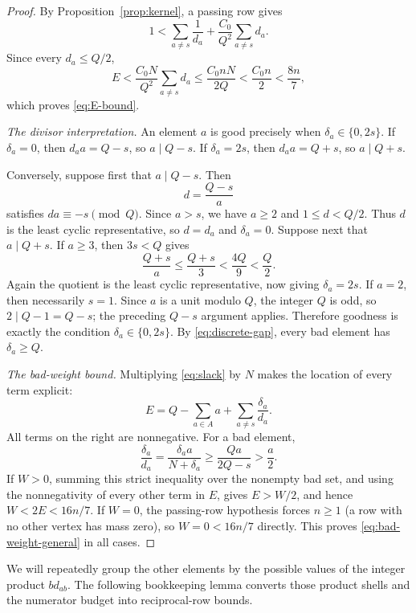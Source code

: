 \documentclass[11pt]{article}
\theoremstyle{definition}
\theoremstyle{remark}
\begin{document}
\begin{proof}
By Proposition~\ref{prop:kernel}, a passing row gives
\[
 1<\sum_{a\ne s}\frac1{d_a}
 +\frac{C_0}{Q^2}\sum_{a\ne s}d_a.
\]
Since every \(d_a\le Q/2\),
\[
 E<\frac{C_0N}{Q^2}\sum_{a\ne s}d_a
 \le\frac{C_0nN}{2Q}<\frac{C_0n}{2}<\frac{8n}{7},
\]
which proves \eqref{eq:E-bound}.

\smallskip
\noindent\emph{The divisor interpretation.}
An element \(a\) is good precisely when
\(\delta_a\in\{0,2s\}\).  If \(\delta_a=0\), then \(d_aa=Q-s\), so
\(a\mid Q-s\).  If
\(\delta_a=2s\), then \(d_aa=Q+s\), so \(a\mid Q+s\).

Conversely, suppose first that \(a\mid Q-s\).  Then
\[
 d=\frac{Q-s}{a}
\]
satisfies \(da\equiv-s\pmod Q\).  Since \(a>s\), we have \(a\ge2\)
and \(1\le d<Q/2\).  Thus \(d\) is the least cyclic representative,
so \(d=d_a\) and \(\delta_a=0\).  Suppose next that
\(a\mid Q+s\).  If \(a\ge3\), then \(3s<Q\) gives
\[
 \frac{Q+s}{a}\le\frac{Q+s}{3}<\frac{4Q}{9}<\frac Q2.
\]
Again the quotient is the least cyclic representative, now giving
\(\delta_a=2s\).  If \(a=2\), then necessarily \(s=1\).  Since \(a\)
is a unit modulo \(Q\), the integer \(Q\) is odd, so
\(2\mid Q-1=Q-s\); the preceding \(Q-s\) argument applies.
Therefore goodness is exactly the condition
\(\delta_a\in\{0,2s\}\).  By \eqref{eq:discrete-gap}, every bad element
has \(\delta_a\ge Q\).

\smallskip
\noindent\emph{The bad-weight bound.}
Multiplying \eqref{eq:slack} by \(N\) makes the location of every term
explicit:
\[
 E=Q-\sum_{a\in A}a+\sum_{a\ne s}\frac{\delta_a}{d_a}.
\]
All terms on the right are nonnegative.  For a bad element,
\[
 \frac{\delta_a}{d_a}
 =\frac{\delta_aa}{N+\delta_a}
 \ge\frac{Qa}{2Q-s}>\frac a2.
\]
If \(W>0\), summing this strict inequality over the nonempty bad set, and
using the nonnegativity of every other term in \(E\), gives
\(E>W/2\), and hence \(W<2E<16n/7\).  If \(W=0\), the passing-row
hypothesis forces \(n\ge1\) (a row with no other vertex has mass zero), so
\(W=0<16n/7\) directly.  This proves \eqref{eq:bad-weight-general} in all
cases.
\end{proof}

We will repeatedly group the other elements by the possible values of the
integer product \(bd_{ab}\).  The following bookkeeping lemma converts those
product shells and the numerator budget into reciprocal-row bounds.
\end{document}
